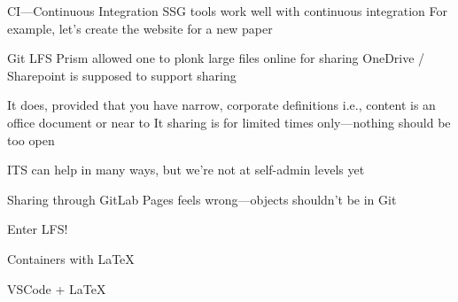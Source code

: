 \documentclass[aspectratio=169,t]{beamer}
\begin{document}
\begin{dframe}{CI---Continuous Integration}
  \1 SSG tools work well with continuous integration
  \1 For example, let's create the website for a new paper
\end{dframe}

\begin{dframe}{Git LFS}
  \1 Prism allowed one to plonk large files online for sharing
  \1 OneDrive / Sharepoint is supposed to support sharing

  \2 It does, provided that you have narrow, corporate definitions
  \2 i.e., content is an office document or near to It
  \2 sharing is for limited times only---nothing should be too open

  \1 ITS can help in many ways, but we're not at self-admin levels yet

  \1 Sharing through GitLab Pages feels wrong---objects shouldn't be in Git
  
  \1 Enter LFS!

\end{dframe}

\begin{dframe}{Containers with \LaTeX}
  \1 
\end{dframe}

\begin{dframe}{VSCode + \LaTeX}
  \1 
\end{dframe}

\begin{comment}
\begin{dframe}{Codespaces}
  \1 
\end{dframe}

\begin{dframe}{Gitpod}
  \1 
\end{dframe}

\begin{dframe}{BYOD and remote teaching}
  \1 
\end{dframe}

\begin{dframe}{FaaS, serverless and responsiveness}
  \1 Edge appearance
\end{dframe}
\end{comment}
\end{document}
